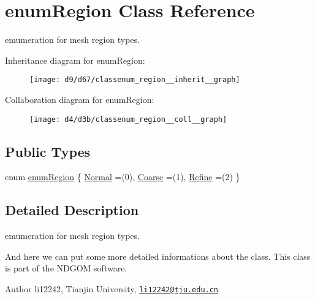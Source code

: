 \hypertarget{classenum_region}{}\section{enum\+Region Class Reference}
\label{classenum_region}


emumeration for mesh region types.  




Inheritance diagram for enum\+Region\+:
\nopagebreak
\begin{figure}[H]
\begin{center}
\leavevmode
\texttt{[image: d9/d67/classenum\_region\_\_inherit\_\_graph]}
\end{center}
\end{figure}


Collaboration diagram for enum\+Region\+:
\nopagebreak
\begin{figure}[H]
\begin{center}
\leavevmode
\texttt{[image: d4/d3b/classenum\_region\_\_coll\_\_graph]}
\end{center}
\end{figure}
\subsection*{Public Types}
\begin{DoxyCompactItemize}
\item 
enum \hyperlink{classenum_region_aff137de0f4813cb7dcba450e00b64916}{enum\+Region} \{ \hyperlink{classenum_region_aff137de0f4813cb7dcba450e00b64916aa6e776b69d01f7c6af578dc51858bb29}{Normal} =(0), 
\hyperlink{classenum_region_aff137de0f4813cb7dcba450e00b64916a8949b3f6c44858bb60cc1621c6950eaa}{Coarse} =(1), 
\hyperlink{classenum_region_aff137de0f4813cb7dcba450e00b64916a0010cabcba2945811b036f5ffe3e3d15}{Refine} =(2)
 \}
\end{DoxyCompactItemize}


\subsection{Detailed Description}
emumeration for mesh region types. 

And here we can put some more detailed informations about the class. This class is part of the N\+D\+G\+OM software. \begin{DoxyAuthor}{Author}
li12242, Tianjin University, \href{mailto:li12242@tju.edu.cn}{\tt li12242@tju.\+edu.\+cn} 
\end{DoxyAuthor}


